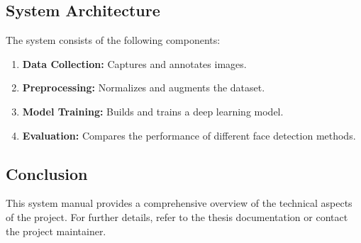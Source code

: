 \documentclass[a4paper]{feidipsp}
\begin{document}
\subsection{System Architecture}

The system consists of the following components:
\begin{enumerate}
    \item \textbf{Data Collection:} Captures and annotates images.
    \item \textbf{Preprocessing:} Normalizes and augments the dataset.
    \item \textbf{Model Training:} Builds and trains a deep learning model.
    \item \textbf{Evaluation:} Compares the performance of different face detection methods.
\end{enumerate}

\subsection{Conclusion}

This system manual provides a comprehensive overview of the technical aspects of the project. For further details, refer to the thesis documentation or contact the project maintainer.

\newpage
\def\refname{References}

\begin{thebibliography}{999}

\end{thebibliography}

\listoffigures

\listoftables
\end{document}
